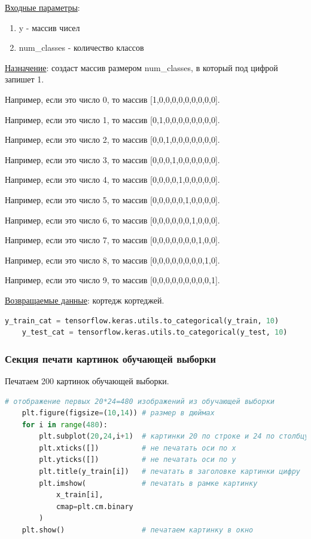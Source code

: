 \underline{Входные параметры}:

\begin{enumerate}
    \item y - массив чисел
    \item num\_classes - количество классов
\end{enumerate}

\underline{Назначение}: создаст массив размером num\_classes, в который под цифрой запишет 1.

Например, если это число 0, то массив [1,0,0,0,0,0,0,0,0,0].

Например, если это число 1, то массив [0,1,0,0,0,0,0,0,0,0].

Например, если это число 2, то массив [0,0,1,0,0,0,0,0,0,0].

Например, если это число 3, то массив [0,0,0,1,0,0,0,0,0,0].

Например, если это число 4, то массив [0,0,0,0,1,0,0,0,0,0].

Например, если это число 5, то массив [0,0,0,0,0,1,0,0,0,0].

Например, если это число 6, то массив [0,0,0,0,0,0,1,0,0,0].

Например, если это число 7, то массив [0,0,0,0,0,0,0,1,0,0].

Например, если это число 8, то массив [0,0,0,0,0,0,0,0,1,0].

Например, если это число 9, то массив [0,0,0,0,0,0,0,0,0,1].

\underline{Возвращаемые данные}: кортедж кортеджей.

\begin{lstlisting}[language=Python,]
    y_train_cat = tensorflow.keras.utils.to_categorical(y_train, 10)
    y_test_cat = tensorflow.keras.utils.to_categorical(y_test, 10)
\end{lstlisting}



\subsubsection{Секция печати картинок обучающей выборки}

Печатаем 200 картинок обучающей выборки.

\begin{lstlisting}[language=Python,]
    # отображение первых 20*24=480 изображений из обучающей выборки
    plt.figure(figsize=(10,14)) # размер в дюймах
    for i in range(480):
        plt.subplot(20,24,i+1)  # картинки 20 по строке и 24 по столбцу
        plt.xticks([])          # не печатать оси по x
        plt.yticks([])          # не печатать оси по y
        plt.title(y_train[i])   # печатать в заголовке картинки цифру
        plt.imshow(             # печатать в рамке картинку
            x_train[i],
            cmap=plt.cm.binary
        )  
    plt.show()                  # печатаем картинку в окно
\end{lstlisting}

